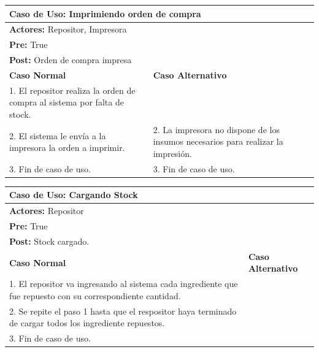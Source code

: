 \documentclass[a4paper,11pt] {article}
\begin{document}
\begin{center}
	\begin{tabular}{ | p{6.5cm} | p{6.5cm} | }
		\hline
			\multicolumn{2}{|l|}{\textbf{Caso de Uso:} Imprimiendo orden de compra} \\
		\hline
			\multicolumn{2}{|l|}{\textbf{Actores:} Repositor, Impresora} \\
		\hline
			\multicolumn{2}{|l|}{\textbf{Pre:} True} \\
		\hline
			\multicolumn{2}{|l|}{\textbf{Post:} Orden de compra impresa} \\
		\hline
		\textbf{Caso Normal} & \textbf{Caso Alternativo}	\\
		\hline
		1. El repositor realiza la orden de compra al sistema por falta de stock. &	\\
		\hline
		2. El sistema le env\'ia a la impresora la orden a imprimir. & 2. La impresora no dispone de los insumos necesarios para realizar la impresi\'on.	\\
		\hline
		3. Fin de caso de uso. & 3. Fin de caso de uso.	\\
		\hline
	\end{tabular}
\end{center}

\begin{center}
	\begin{tabular}{ | p{6.5cm} | p{6.5cm} | }
		\hline
			\multicolumn{2}{|l|}{\textbf{Caso de Uso:} Cargando Stock} \\
		\hline
			\multicolumn{2}{|l|}{\textbf{Actores:} Repositor} \\
		\hline
			\multicolumn{2}{|l|}{\textbf{Pre:} True} \\
		\hline
			\multicolumn{2}{|l|}{\textbf{Post:} Stock cargado.} \\
		\hline
		\textbf{Caso Normal} & \textbf{Caso Alternativo}	\\
		\hline
		1. El repositor va ingresando al sistema cada ingrediente que fue repuesto con su correspondiente cantidad. &	\\
		\hline
		2. Se repite el paso 1 hasta que el respositor haya terminado de cargar todos los ingrediente repuestos. &	\\
		\hline
		3. Fin de caso de uso. &	\\
		\hline
	\end{tabular}
\end{center}
\end{document}
